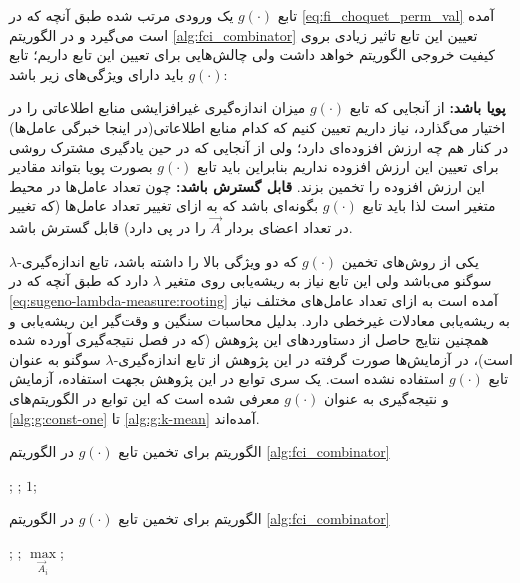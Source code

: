 تابع $g(\cdot)$ یک ورودی مرتب شده طبق آنچه که در \ref{eq:fi_choquet_perm_val} آمده است می‌گیرد و در الگوریتم \ref{alg:fci_combinator} تعیین این تابع تاثیر زیادی بروی کیفیت خروجی الگوریتم خواهد داشت ولی چالش‌هایی برای تعیین این تابع داریم؛ تابع $g(\cdot)$ باید دارای ویژگی‌های زیر باشد:
\begin{enumerate}
 \textbf{پویا باشد:} از آنجایی که تابع $g(\cdot)$ میزان اندازه‌گیری غیرافزایشی منابع اطلاعاتی را در اختیار می‌گذارد، نیاز داریم تعیین کنیم که کدام منابع اطلاعاتی(در اینجا خبرگی عامل‌ها) در کنار هم چه ارزش افزوده‌ای دارد؛ ولی از آنجایی که در حین یادگیری مشترک روشی برای تعیین این ارزش افزوده نداریم بنابراین باید تابع $g(\cdot)$ بصورت پویا بتواند مقادیر این ارزش افزوده را تخمین بزند.
 \textbf{قابل گسترش  باشد:} چون تعداد عامل‌ها در محیط متغیر است لذا باید تابع $g(\cdot)$ بگونه‌ای باشد که به ازای تغییر تعداد عامل‌ها (که تغییر در تعداد اعضای بردار $\vec{A}$ را در پی دارد) قابل گسترش باشد.
\end{enumerate}
 یکی از روش‌‌های تخمین $g(\cdot)$ که دو ویژگی بالا را داشته باشد، تابع اندازه‌گیری-$\lambda$ سوگنو می‌باشد ولی این تابع نیاز به ریشه‌یابی روی متغیر $\lambda$ دارد که طبق آنچه که در \ref{eq:sugeno-lambda-measure:rooting} آمده است به ازای تعداد عامل‌های مختلف نیاز به ریشه‌یابی معادلات غیرخطی دارد. بدلیل محاسبات سنگین و وقت‌گیر این ریشه‌‌یابی و همچنین نتایج حاصل از دستاوردهای این پژوهش (که در فصل نتیجه‌گیری آورده شده است)، در آزمایش‌ها صورت گرفته در این پژوهش از تابع اندازه‌گیری-$\lambda$ سوگنو به عنوان تابع $g(\cdot)$ استفاده نشده است. یک سری توابع در این پژوهش بجهت استفاده، آزمایش و نتیجه‌گیری به عنوان $g(\cdot)$ معرفی شده است که این توابع در الگوریتم‌های \ref{alg:g:const-one} تا \ref{alg:g:k-mean} آمده‌اند.

\begin{algorithm}[t]
\caption{الگوریتم  برای تخمین تابع $g(\cdot)$ در الگوریتم \ref{alg:fci_combinator}}\label{alg:g:const-one}
\begin{latin}
\begin{algorithmic}[1]
		\State {};
		\State {};
	\Else
		\State \Return $1$;
	\EndIf
\EndFunction
\end{algorithmic}
\end{latin}
\end{algorithm}

\begin{algorithm}[t]
\caption{الگوریتم  برای تخمین تابع $g(\cdot)$ در الگوریتم \ref{alg:fci_combinator}}\label{alg:g:max}
\begin{latin}
\begin{algorithmic}[1]
		\State {};
		\State {};
	\Else
		\State \Return $\max\limits_{\vec{A}_i}$;
	\EndIf
\EndFunction
\end{algorithmic}
\end{latin}
\end{algorithm}

